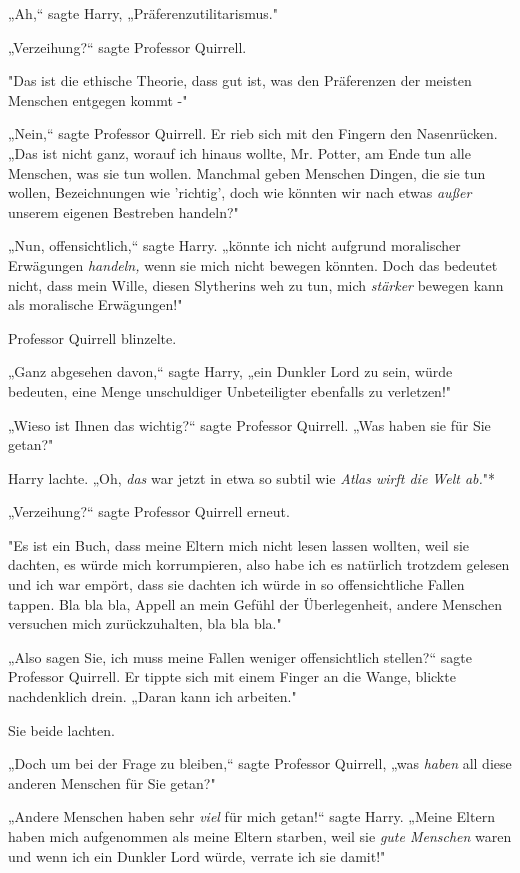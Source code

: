 {„Ah,“ sagte Harry, „Präferenzutilitarismus."

„Verzeihung?“ sagte Professor Quirrell.

"Das ist die ethische Theorie, dass gut ist, was den Präferenzen der meisten Menschen entgegen kommt -"

„Nein,“ sagte Professor Quirrell. Er rieb sich mit den Fingern den Nasenrücken. „Das ist nicht ganz, worauf ich hinaus wollte, Mr. Potter, am Ende tun alle Menschen, was sie tun wollen. Manchmal geben Menschen Dingen, die sie tun wollen, Bezeichnungen wie 'richtig', doch wie könnten wir nach etwas \emph{außer} unserem eigenen Bestreben handeln?"

„Nun, offensichtlich,“ sagte Harry. „könnte ich nicht aufgrund moralischer Erwägungen \emph{handeln,} wenn sie mich nicht bewegen könnten. Doch das bedeutet nicht, dass mein Wille, diesen Slytherins weh zu tun, mich \emph{stärker} bewegen kann als moralische Erwägungen!"

Professor Quirrell blinzelte.

„Ganz abgesehen davon,“ sagte Harry, „ein Dunkler Lord zu sein, würde bedeuten, eine Menge unschuldiger Unbeteiligter ebenfalls zu verletzen!"

„Wieso ist Ihnen das wichtig?“ sagte Professor Quirrell. „Was haben sie für Sie getan?"

Harry lachte. „Oh, \emph{das} war jetzt in etwa so subtil wie \emph{Atlas wirft die Welt ab.}"*

„Verzeihung?“ sagte Professor Quirrell erneut.

"Es ist ein Buch, dass meine Eltern mich nicht lesen lassen wollten, weil sie dachten, es würde mich korrumpieren, also habe ich es natürlich trotzdem gelesen und ich war empört, dass sie dachten ich würde in so offensichtliche Fallen tappen. Bla bla bla, Appell an mein Gefühl der Überlegenheit, andere Menschen versuchen mich zurückzuhalten, bla bla bla."

„Also sagen Sie, ich muss meine Fallen weniger offensichtlich stellen?“ sagte Professor Quirrell. Er tippte sich mit einem Finger an die Wange, blickte nachdenklich drein. „Daran kann ich arbeiten."

Sie beide lachten.

„Doch um bei der Frage zu bleiben,“ sagte Professor Quirrell, „was \emph{haben} all diese anderen Menschen für Sie getan?"

„Andere Menschen haben sehr \emph{viel} für mich getan!“ sagte Harry. „Meine Eltern haben mich aufgenommen als meine Eltern starben, weil sie \emph{gute Menschen} waren und wenn ich ein Dunkler Lord würde, verrate ich sie damit!"

}
